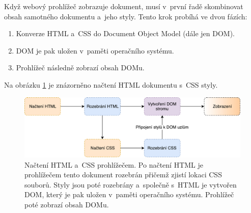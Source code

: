 Když webový prohlížeč zobrazuje dokument, musí v~první řadě skombinovat obsah samotného dokumentu a~jeho styly. Tento krok probíhá ve dvou fázích:

\begin{enumerate}
	\item Konverze HTML a~CSS do Document Object Model (dále jen DOM).
	\item DOM je pak uložen v~paměti operačního systému. 
	\item Prohlížeč následně zobrazí obsah DOMu.
\end{enumerate}

Na obrázku \ref{fig:CSSLoad} je znázorněno načtení HTML dokumentu s~CSS styly.

\begin{figure} [H]
	\centering
	\includegraphics[width=14cm]{../CSSLoad.pdf}
	\caption{Načtení HTML a~CSS prohlížečem. Po načtení HTML je prohlížečem tento dokument rozebrán přičemž zjistí lokaci CSS souborů. Styly jsou poté rozebrány a~společně s~HTML je vytvořen DOM, který je pak uložen v~paměti operačního systému. Prohlížeč poté zobrazí obsah DOMu.}
	\label{fig:CSSLoad}
\end{figure}

